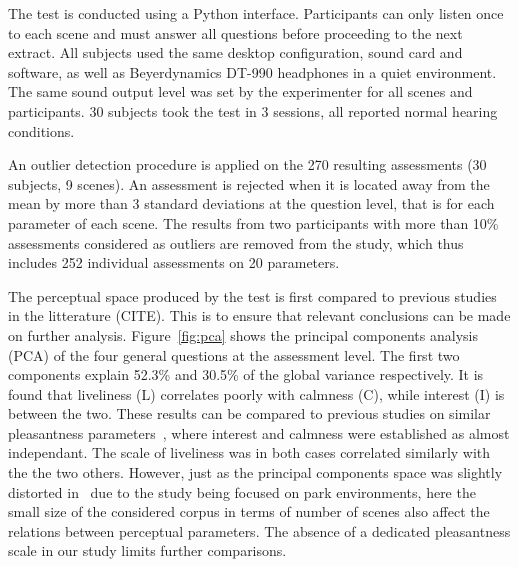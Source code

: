\documentclass{article}
\begin{document}
\begin{sloppy}
The test is conducted using a Python interface. Participants can only listen once to each scene and must answer all questions before proceeding to the next extract. All subjects used the same desktop configuration, sound card and software, as well as Beyerdynamics DT-990 headphones in a quiet environment. The same sound output level was set by the experimenter for all scenes and participants. 30 subjects took the test in 3 sessions, all reported normal hearing conditions.

An outlier detection procedure is applied on the 270 resulting assessments (30 subjects, 9 scenes). An assessment is rejected when it is located away from the mean by more than 3 standard deviations at the question level, that is for each parameter of each scene. The results from two participants with more than 10\% assessments considered as outliers are removed from the study, which thus includes 252 individual assessments on 20 parameters.

The perceptual space produced by the test is first compared to previous studies in the litterature (CITE). This is to ensure that relevant conclusions can be made on further analysis. Figure~\ref{fig:pca} shows the principal components analysis (PCA) of the four general questions at the assessment level. The first two components explain 52.3\% and 30.5\% of the global variance respectively. It is found that liveliness (L) correlates poorly with calmness (C), while interest (I) is between the two. These results can be compared to previous studies on similar pleasantness parameters~\cite{axelsson2010,jeon2018}, where interest and calmness were established as almost independant. The scale of liveliness was in both cases correlated similarly with the the two others. However, just as the principal components space was slightly distorted in~\cite{jeon2018} due to the study being focused on park environments, here the small size of the considered corpus in terms of number of scenes also affect the relations between perceptual parameters. The absence of a dedicated pleasantness scale in our study limits further comparisons.


\end{sloppy}
\end{document}
